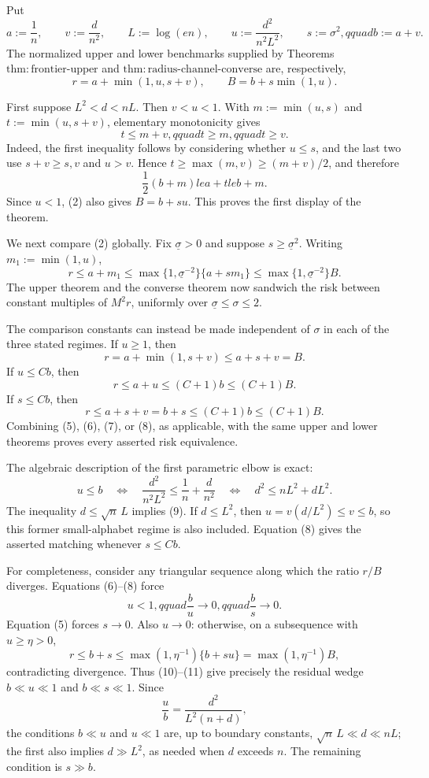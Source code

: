 Put
\[
 a:=\frac1n,\qquad v:=\frac d{n^2},\qquad
 L:=\log(en),\qquad u:=\frac{d^2}{n^2L^2},
 \qquad s:=\sigma^2,qquad b:=a+v.
\tag{1}
\]
The normalized upper and lower benchmarks supplied by Theorems~\(\mathrm{thm:frontier\text{-}upper}\) and \(\mathrm{thm:radius\text{-}channel\text{-}converse}\) are, respectively,
\[
 r=a+\min(1,u,s+v),
 \qquad B=b+s\min(1,u).
\tag{2}
\]

First suppose \(L^2<d<nL\).  Then \(v<u<1\).  With \(m:=\min(u,s)\) and \(t:=\min(u,s+v)\), elementary monotonicity gives
\[
 t\le m+v,qquad t\ge m,qquad t\ge v.
\tag{3}
\]
Indeed, the first inequality follows by considering whether \(u\le s\), and the last two use \(s+v\ge s,v\) and \(u>v\).  Hence \(t\ge\max(m,v)\ge(m+v)/2\), and therefore
\[
 \frac12(b+m)le a+tle b+m.
\tag{4}
\]
Since \(u<1\), (2) also gives \(B=b+su\).  This proves the first display of the theorem.

We next compare (2) globally.  Fix \(\underline\sigma>0\) and suppose \(s\ge\underline\sigma^2\).  Writing \(m_1:=\min(1,u)\),
\[
 r\le a+m_1
 \le \max\{1,\underline\sigma^{-2}\}\{a+s m_1\}
 \le \max\{1,\underline\sigma^{-2}\}B.
\tag{5}
\]
The upper theorem and the converse theorem now sandwich the risk between constant multiples of \(M^2r\), uniformly over \(\underline\sigma\le\sigma\le2\).

The comparison constants can instead be made independent of \(\sigma\) in each of the three stated regimes.  If \(u\ge1\), then
\[
 r=a+\min(1,s+v)\le a+s+v=B.
\tag{6}
\]
If \(u\le Cb\), then
\[
 r\le a+u\le(C+1)b\le(C+1)B.
\tag{7}
\]
If \(s\le Cb\), then
\[
 r\le a+s+v=b+s\le(C+1)b\le(C+1)B.
\tag{8}
\]
Combining (5), (6), (7), or (8), as applicable, with the same upper and lower theorems proves every asserted risk equivalence.

The algebraic description of the first parametric elbow is exact:
\[
 u\le b
 \quad\Longleftrightarrow\quad
 \frac{d^2}{n^2L^2}\le\frac1n+\frac d{n^2}
 \quad\Longleftrightarrow\quad
 d^2\le nL^2+dL^2.
\tag{9}
\]
The inequality \(d\le\sqrt n\,L\) implies (9).  If \(d\le L^2\), then \(u=v(d/L^2)\le v\le b\), so this former small-alphabet regime is also included.  Equation (8) gives the asserted matching whenever \(s\le Cb\).

For completeness, consider any triangular sequence along which the ratio \(r/B\) diverges.  Equations (6)--(8) force
\[
 u<1,qquad \frac bu\longrightarrow0,qquad
 \frac bs\longrightarrow0.
\tag{10}
\]
Equation (5) forces \(s\to0\).  Also \(u\to0\): otherwise, on a subsequence with \(u\ge\eta>0\),
\[
 r\le b+s
 \le\max(1,\eta^{-1})\{b+su\}
 =\max(1,\eta^{-1})B,
\tag{11}
\]
contradicting divergence.  Thus (10)--(11) give precisely the residual wedge \(b\ll u\ll1\) and \(b\ll s\ll1\).  Since
\[
 \frac ub=\frac{d^2}{L^2(n+d)},
\tag{12}
\]
the conditions \(b\ll u\) and \(u\ll1\) are, up to boundary constants, \(\sqrt n\,L\ll d\ll nL\); the first also implies \(d\gg L^2\), as needed when \(d\) exceeds \(n\).  The remaining condition is \(s\gg b\).

